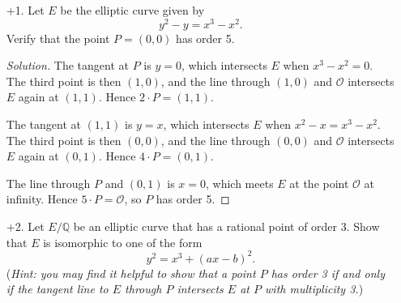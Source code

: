 \documentclass[a4paper]{article}
\theoremstyle{plain}
\theoremstyle{remark}
\theoremstyle{definition}
\renewcommand{\O}{\mathcal{O}}
\newcommand{\Q}{\mathbb{Q}}
\begin{document}
\begin{enumerate}
    \item[+1.] Let $E$ be the elliptic curve given by
        \begin{equation*}
            y^2-y = x^3-x^2.
        \end{equation*}
        Verify that the point $P=(0,0)$ has order 5.

        \begin{proof}[Solution]
            The tangent at $P$ is $y=0$, which intersects $E$ when $x^3-x^2=0$.
            The third point is then $(1,0)$, and the line through $(1,0)$ and
            $\O$ intersects $E$ again at $(1,1)$. Hence $2\cdot P=(1,1)$.

            The tangent at $(1,1)$ is $y=x$, which intersects $E$ when
            $x^2-x=x^3-x^2$. The third point is then $(0,0)$, and the line
            through $(0,0)$ and $\O$ intersects $E$ again at $(0,1)$. Hence
            $4\cdot P=(0,1)$.

            The line through $P$ and $(0,1)$ is $x=0$, which meets $E$ at the
            point $\O$ at infinity. Hence $5\cdot P=\O$, so $P$ has order 5.
        \end{proof}

    \item[+2.] Let $E/\Q$ be an elliptic curve that has a rational point of order
        3. Show that $E$ is isomorphic to one of the form
        \begin{equation*}
            y^2 = x^3 + (ax-b)^2.
        \end{equation*}
        (\textit{Hint: you may find it helpful to show that a point $P$ has
        order 3 if and only if the tangent line to $E$ through $P$ intersects
        $E$ at $P$ with multiplicity 3.})


\end{enumerate}
\end{document}
